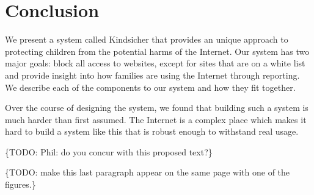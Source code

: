 
\section{Conclusion}

We present a system called Kindsicher that provides an unique approach to
protecting children from the potential harms of the Internet. Our system has
two major goals: block all access to websites, except for sites that are on a
white list and provide insight into how families are using the Internet through
reporting. We describe each of the components to our system and how they fit
together.

Over the course of designing the system, we found that building such a system
is much harder than first assumed. The Internet is a complex place which makes
it hard to build a system like this that is robust enough to withstand real
usage.

\{TODO: Phil: do you concur with this proposed text?\}

\{TODO: make this last paragraph appear on the same page with one of the
figures.\}
